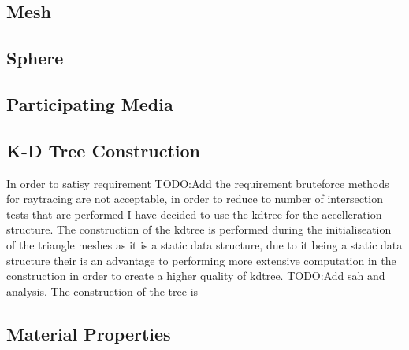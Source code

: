 \subsection{Mesh}
\subsection{Sphere}

\subsection{Participating Media}

\subsection{K-D Tree Construction}
In order to satisy requirement TODO:Add the requirement bruteforce methods for raytracing are not acceptable, in order to reduce
to number of intersection tests that are performed I have decided to use the kdtree for the accelleration structure. The
construction of the kdtree is performed during the initialiseation of the triangle meshes as it is a static data structure, due
to it being a static data structure their is an advantage to performing more extensive computation in the construction in
order to create a higher quality of kdtree. TODO:Add sah and analysis. The construction of the tree is 

\subsection{Material Properties}
